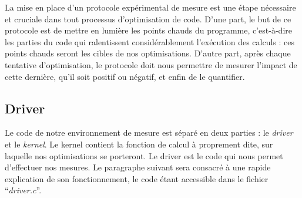 \documentclass[12pt,a4paper]{article}
\begin{document}
La mise en place d'un protocole expérimental de mesure est une étape nécessaire
et cruciale dans tout processus d'optimisation de code. D'une part, le but de ce
protocole est de mettre en lumière les points chauds du programme, c'est-à-dire
les parties du code qui ralentissent considérablement l'exécution des calculs :
ces points chauds seront les cibles de nos optimisations. D'autre part, après
chaque tentative d'optimisation, le protocole doit nous permettre de mesurer
l'impact de cette dernière, qu'il soit positif ou négatif, et enfin de le
quantifier.

\subsection{Driver}

Le code de notre environnement de mesure est séparé en deux parties : le \textit{driver}
et le \textit{kernel}. Le kernel contient la fonction de calcul à proprement
dite, sur laquelle nos optimisations se porteront. Le driver est le code qui
nous permet d'effectuer nos mesures. Le paragraphe suivant sera consacré à une
rapide explication de son fonctionnement, le code étant accessible dans le fichier
\enquote{\textit{driver.c}}.
\end{document}
